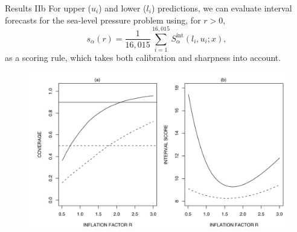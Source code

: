 \begin{frame}{Results IIb}
 For upper ($u_i$) and lower ($l_i$) predictions, we can evaluate interval forecasts for the sea-level pressure problem using, for $r>0$,
 \[ s_{\alpha}(r) = \frac{1}{16 ,015}\sum_{i=1}^{16 ,015} S_{\alpha}^{\text{int}}(l_i, u_i; x), \]
 as a scoring rule, which takes both calibration and sharpness into account.

 \begin{figure}
 \begin{center}
  \includegraphics[scale=0.25]{figures/sealevelpressure2.pdf}
 \end{center}
\end{figure}
\end{frame}


